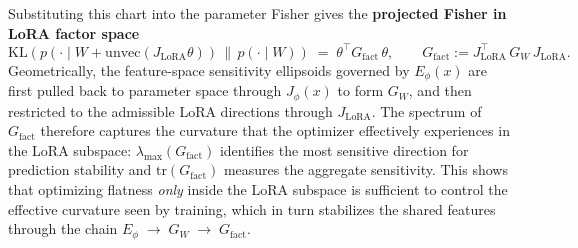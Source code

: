 \documentclass{article} %
\begin{document}
Substituting this chart into the parameter Fisher gives the \textbf{projected Fisher in LoRA factor space}
\begin{equation}
\label{eq:lora-fisher}
\mathrm{KL}\!\left(p(\cdot\mid W+\mathrm{unvec}(J_{\mathrm{LoRA}}\theta))\,\big\|\,p(\cdot\mid W)\right)
\;=\; \theta^\top G_{\mathrm{fact}}\,\theta,
\qquad
G_{\mathrm{fact}}:=J_{\mathrm{LoRA}}^\top\,G_W\,J_{\mathrm{LoRA}}.
\end{equation}
Geometrically, the feature-space sensitivity ellipsoids governed by $E_\phi(x)$ are first pulled back to parameter space through $J_\phi(x)$ to form $G_W$, and then restricted to the admissible LoRA directions through $J_{\mathrm{LoRA}}$. The spectrum of $G_{\mathrm{fact}}$ therefore captures the curvature that the optimizer effectively experiences in the LoRA subspace: $\lambda_{\max}(G_{\mathrm{fact}})$ identifies the most sensitive direction for prediction stability and $\mathrm{tr}(G_{\mathrm{fact}})$ measures the aggregate sensitivity. This shows that optimizing flatness \emph{only} inside the LoRA subspace is sufficient to control the effective curvature seen by training, which in turn stabilizes the shared features through the chain 
$E_\phi \;\to\; G_W \;\to\; G_{\mathrm{fact}}$.
\end{document}
